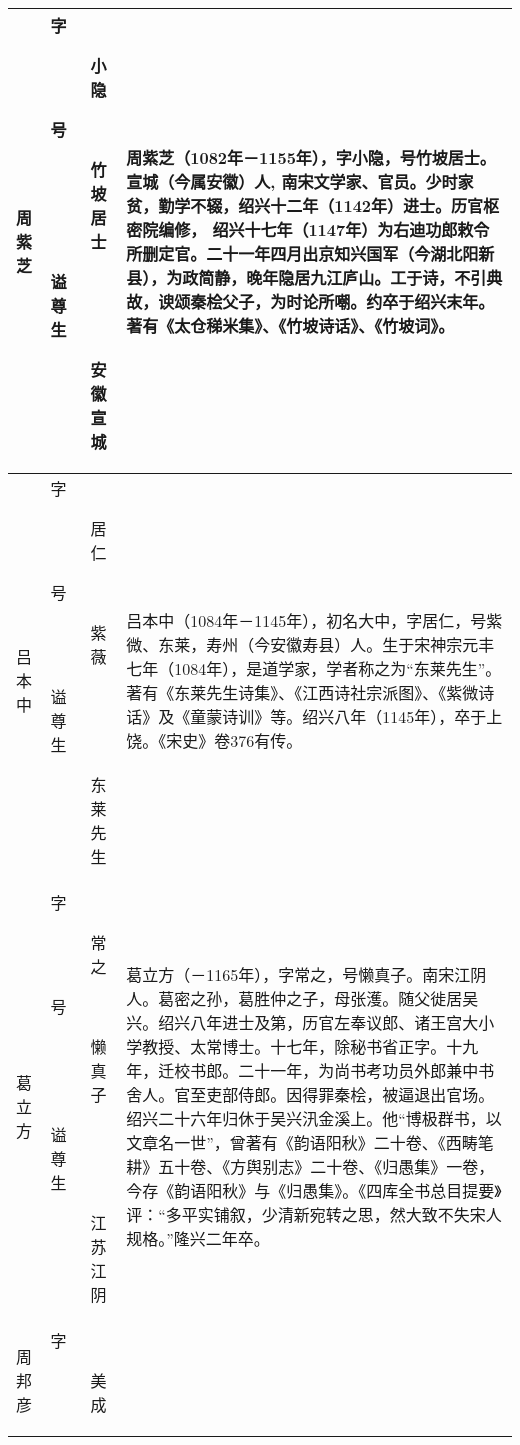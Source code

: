 \begin{longtable}{|>{\centering\namefont\heiti}m{2em}|>{\centering\tiny}m{3.0em}|>{\xzfont\kaiti}m{7em}|}
  周紫芝 & \begin{description}
  \item[字] 小隐
  \item[号] 竹坡居士
  \item[谥] 
  \item[尊] 
  \item[生] 安徽宣城
  \end{description} & 周紫芝（1082年－1155年），字小隐，号竹坡居士。宣城（今属安徽）人, 南宋文学家、官员。少时家贫，勤学不辍，绍兴十二年（1142年）进士。历官枢密院编修， 绍兴十七年（1147年）为右迪功郎敕令所删定官。二十一年四月出京知兴国军（今湖北阳新县），为政简静，晚年隐居九江庐山。工于诗，不引典故，谀颂秦桧父子，为时论所嘲。约卒于绍兴末年。著有《太仓稊米集》、《竹坡诗话》、《竹坡词》。 \tabularnewline\hline
  吕本中 & \begin{description}
  \item[字] 居仁
  \item[号] 紫薇
  \item[谥] 
  \item[尊] 
  \item[生] 东莱先生
  \end{description} & 吕本中（1084年－1145年），初名大中，字居仁，号紫微、东莱，寿州（今安徽寿县）人。生于宋神宗元丰七年（1084年），是道学家，学者称之为“东莱先生”。著有《东莱先生诗集》、《江西诗社宗派图》、《紫微诗话》及《童蒙诗训》等。绍兴八年（1145年），卒于上饶。《宋史》卷376有传。 \tabularnewline\hline
  葛立方 & \begin{description}
  \item[字] 常之
  \item[号] 懒真子
  \item[谥] 
  \item[尊] 
  \item[生] 江苏江阴
  \end{description} & 葛立方（－1165年），字常之，号懒真子。南宋江阴人。葛密之孙，葛胜仲之子，母张濩。随父徙居吴兴。绍兴八年进士及第，历官左奉议郎、诸王宫大小学教授、太常博士。十七年，除秘书省正字。十九年，迁校书郎。二十一年，为尚书考功员外郎兼中书舍人。官至吏部侍郎。因得罪秦桧，被逼退出官场。绍兴二十六年归休于吴兴汛金溪上。他“博极群书，以文章名一世”，曾著有《韵语阳秋》二十卷、《西畴笔耕》五十卷、《方舆别志》二十卷、《归愚集》一卷，今存《韵语阳秋》与《归愚集》。《四库全书总目提要》评：“多平实铺叙，少清新宛转之思，然大致不失宋人规格。”隆兴二年卒。 \tabularnewline\hline
  周邦彦 & \begin{description}
  \item[字] 美成

\end{description}
\end{longtable}
